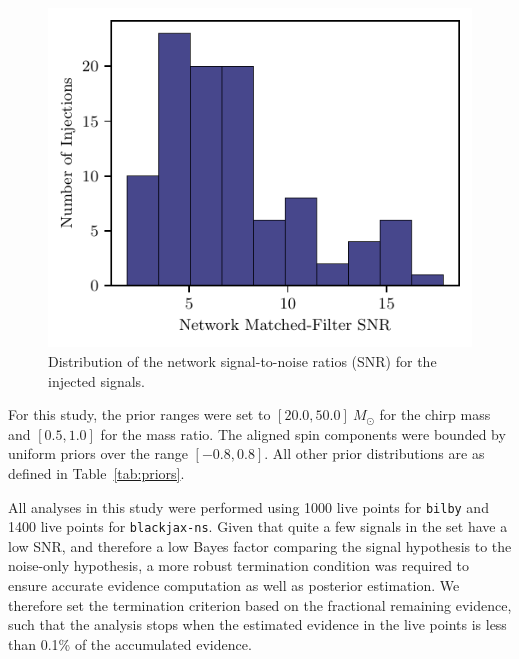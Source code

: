 \documentclass[fleqn,usenatbib]{mnras}
\providecommand{\DIFdelbegin}{} %
\newcommand{\DIFscaledelfig}{0.5}
\newlength{\DIFdelgraphicswidth} %
\newlength{\DIFdelgraphicsheight} %
\newcommand{\DIFdelincludegraphics}[2][]{%
\sbox{\DIFdelgraphicsbox}{\DIFOincludegraphics[#1]{#2}}%
\settoboxwidth{\DIFdelgraphicswidth}{\DIFdelgraphicsbox} %
\settoboxtotalheight{\DIFdelgraphicsheight}{\DIFdelgraphicsbox} %
\scalebox{\DIFscaledelfig}{%
\parbox[b]{\DIFdelgraphicswidth}{\usebox{\DIFdelgraphicsbox}\\[-\baselineskip] \rule{\DIFdelgraphicswidth}{0em}}\llap{\resizebox{\DIFdelgraphicswidth}{\DIFdelgraphicsheight}{%
\setlength{\unitlength}{\DIFdelgraphicswidth}%
\begin{picture}(1,1)%
\thicklines\linethickness{2pt} %
{\color[rgb]{1,0,0}\put(0,0){\framebox(1,1){}}}%
{\color[rgb]{1,0,0}\put(0,0){\line( 1,1){1}}}%
{\color[rgb]{1,0,0}\put(0,1){\line(1,-1){1}}}%
\end{picture}%
}\hspace*{3pt}}} %
} %
\DeclareRobustCommand{\DIFdelbegin}{\DIFOdelbegin \let\includegraphics\DIFdelincludegraphics} %
\begin{document}
\begin{figure}
    \centering
    \includegraphics{figures/injection_snr_hist.pdf}
    \caption{Distribution of the network signal-to-noise ratios (SNR) for the injected signals.}
    \label{fig:snr_dist}
\end{figure}


For this study, the prior ranges were set to $[20.0, 50.0]~M_{\odot}$
for the chirp mass and $[0.5, 1.0]$ for the mass ratio. The aligned
spin components were bounded by uniform priors over the range
$[-0.8, 0.8]$. All other prior distributions are as defined in
Table~\ref{tab:priors}.

All analyses in this study were performed using 1000 live points for \texttt{bilby} and
1400 live points for \texttt{blackjax-ns}. Given that quite a few signals in the set have a low SNR, and therefore a
low Bayes factor comparing the signal hypothesis to the noise-only
hypothesis, a more robust termination condition was required to
ensure accurate evidence computation as well as posterior estimation.
We therefore set the termination criterion based on the fractional
remaining evidence, such that the analysis stops when the estimated
evidence in the live points is less than 0.1\% of the accumulated
evidence. \DIFdelbegin %
\end{document}
